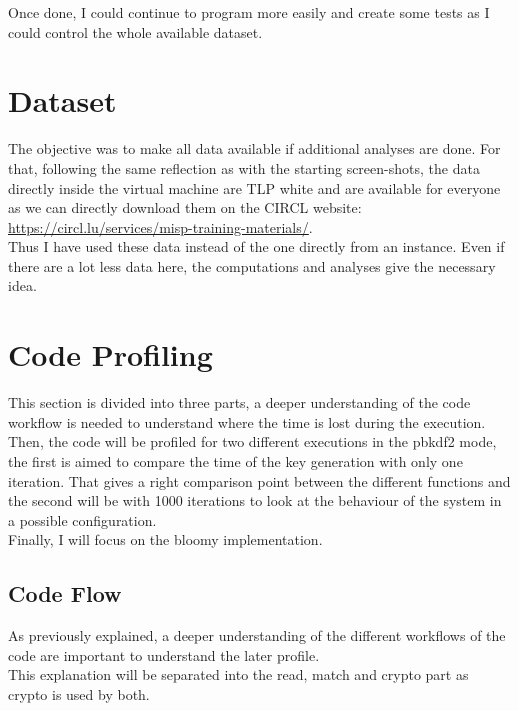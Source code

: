 \documentclass{eplmastersthesis}
\begin{document}
Once done, I could continue to program more easily and create some tests as I could control the whole available dataset.\\


\section{Dataset}
The objective was to make all data available if additional analyses are done. For that, following the same reflection as with the starting screen-shots, the data directly inside the virtual machine are TLP white and are available for everyone as we can directly download them on the CIRCL website: \url{https://circl.lu/services/misp-training-materials/}.\\
Thus I have used these data instead of the one directly from an instance. Even if there are a lot less data here, the computations and analyses give the necessary idea.

\section{Code Profiling}
This section is divided into three parts, a deeper understanding of the code workflow is needed to understand where the time is lost during the execution. Then, the code will be profiled for two different executions in the \gls{pbkdf2} mode, the first is aimed to compare the time of the key generation with only one iteration. That gives a right comparison point between the different functions and the second will be with 1000 iterations to look at the behaviour of the system in a possible configuration. \\
Finally, I will focus on the bloomy implementation.

\subsection{Code Flow}
As previously explained, a deeper understanding of the different workflows of the code are important to understand the later profile.\\
This explanation will be separated into the read, match and crypto part as crypto is used by both.
\end{document}
